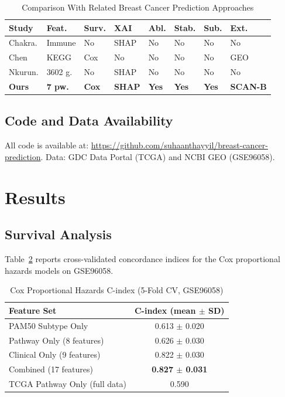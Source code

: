 \documentclass[journal]{IEEEtran}
\begin{document}
\begin{table}[!t]
\centering
\caption{Comparison With Related Breast Cancer Prediction Approaches}
\label{tab:comparison}
\footnotesize
\begin{tabular}{p{1.2cm} p{1.1cm} p{0.7cm} p{0.5cm} p{0.5cm} p{0.5cm} p{0.5cm} p{0.5cm}}
\toprule
\textbf{Study} & \textbf{Feat.} & \textbf{Surv.} & \textbf{XAI} & \textbf{Abl.} & \textbf{Stab.} & \textbf{Sub.} & \textbf{Ext.} \\
\midrule
Chakra. & Immune & No & SHAP & No & No & No & No \\
Chen & KEGG & Cox & No & No & No & No & GEO \\
Nkurun. & 3602 g. & No & SHAP & No & No & No & No \\
\textbf{Ours} & \textbf{7 pw.} & \textbf{Cox} & \textbf{SHAP} & \textbf{Yes} & \textbf{Yes} & \textbf{Yes} & \textbf{SCAN-B} \\
\bottomrule
\end{tabular}
\end{table}

\subsection{Code and Data Availability}

All code is available at: \url{https://github.com/suhaanthayyil/breast-cancer-prediction}. Data: GDC Data Portal (TCGA) and NCBI GEO (GSE96058).


\section{Results}
\label{sec:results}

\subsection{Survival Analysis}

Table~\ref{tab:cox} reports cross-validated concordance indices for the Cox proportional hazards models on GSE96058.

\begin{table}[!t]
\centering
\caption{Cox Proportional Hazards C-index (5-Fold CV, GSE96058)}
\label{tab:cox}
\footnotesize
\begin{tabular}{l c}
\toprule
\textbf{Feature Set} & \textbf{C-index (mean $\pm$ SD)} \\
\midrule
PAM50 Subtype Only & 0.613 $\pm$ 0.020 \\
Pathway Only (8 features) & 0.626 $\pm$ 0.030 \\
Clinical Only (9 features) & 0.822 $\pm$ 0.030 \\
Combined (17 features) & \textbf{0.827 $\pm$ 0.031} \\
\midrule
TCGA Pathway Only (full data) & 0.590 \\
\bottomrule
\end{tabular}
\end{table}
\end{document}

